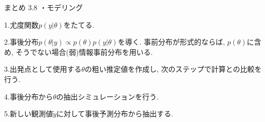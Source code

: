 \documentclass[10pt,dvipdfmx,a4]{beamer}
\begin{document}

\begin{frame}[t]{まとめ 3.8}
・モデリング

1.尤度関数$p(y|\theta)$をたてる.

2.事後分布$p(\theta|y)\propto p(\theta)p(y|\theta)$を導く.
事前分布が形式的ならば, $p(\theta)$に含め, そうでない場合(弱)情報事前分布を用いる.

3.出発点として使用する$\theta$の粗い推定値を作成し, 次のステップで計算との比較を行う.

4.事後分布から$\theta$の抽出シミュレーションを行う.

5.新しい観測値$\tilde{y}$に対して事後予測分布から抽出する.
\end{frame}

\end{document}
